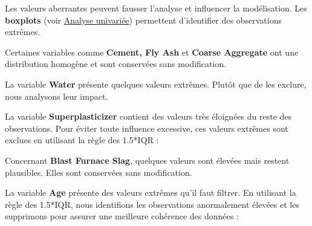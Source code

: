\documentclass[
  12pt,
]{article}
\newenvironment{Shaded}{\begin{snugshade}}{\end{snugshade}}
\newcommand{\CommentTok}[1]{\textcolor[rgb]{0.56,0.35,0.01}{\textit{#1}}}
\newcommand{\FloatTok}[1]{\textcolor[rgb]{0.00,0.00,0.81}{#1}}
\newcommand{\FunctionTok}[1]{\textcolor[rgb]{0.13,0.29,0.53}{\textbf{#1}}}
\newcommand{\NormalTok}[1]{#1}
\newcommand{\OtherTok}[1]{\textcolor[rgb]{0.56,0.35,0.01}{#1}}
\newcommand{\SpecialCharTok}[1]{\textcolor[rgb]{0.81,0.36,0.00}{\textbf{#1}}}
\begin{document}
Les valeurs aberrantes peuvent fausser l'analyse et influencer la
modélisation. Les \textbf{boxplots} (voir
\hyperref[duxe9tection-des-valeurs-aberrantes-boxplots]{Analyse
univariée}) permettent d'identifier des observations extrêmes.

Certaines variables comme \textbf{Cement, Fly Ash} et \textbf{Coarse
Aggregate} ont une distribution homogène et sont conservées sans
modification.

La variable \textbf{Water} présente quelques valeurs extrêmes. Plutôt
que de les exclure, nous analysons leur impact.

La variable \textbf{Superplasticizer} contient des valeurs très
éloignées du reste des observations. Pour éviter toute influence
excessive, ces valeurs extrêmes sont exclues en utilisant la règle des
1.5*IQR :

\begin{Shaded}
\end{Shaded}

Concernant \textbf{Blast Furnace Slag}, quelques valeurs sont élevées
mais restent plausibles. Elles sont conservées sans modification.

La variable \textbf{Age} présente des valeurs extrêmes qu'il faut
filtrer. En utilisant la règle des 1.5*IQR, nous identifions les
observations anormalement élevées et les supprimons pour assurer une
meilleure cohérence des données :
\end{document}
